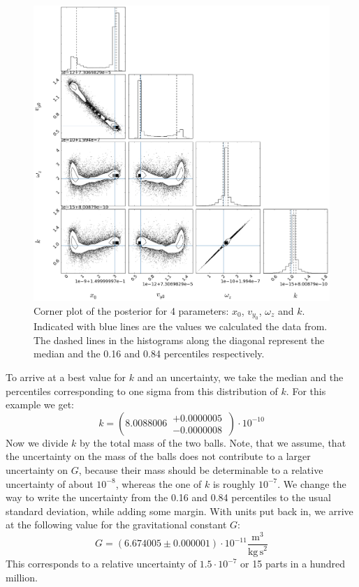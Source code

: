 \documentclass[prb,preprint]{revtex4-1}
\begin{document}
\begin{figure}[h]
	\centering
	\includegraphics[width=1.0\textwidth]{img/4cornerfit.png}
	\caption{Corner plot of the posterior for 4 parameters: $x_0$, $v_{y_0}$, $\omega_z$ and $k$. Indicated with blue lines are the values we calculated the data from. The dashed lines in the histograms along the diagonal represent the median and the 0.16 and 0.84 percentiles respectively.}
	\label{fig:plotCorner4}
\end{figure}

To arrive at a best value for $k$ and an uncertainty, we take the median and the percentiles corresponding to one sigma from this distribution of $k$. For this example we get:
\begin{equation}\label{eq:kfit}
k = \left( 8.0088006 \, \substack{+0.0000005 \\ -0.0000008}\, \right) \cdot 10^{-10}
\end{equation}
Now we divide $k$ by the total mass of the two balls. Note, that we assume, that the uncertainty on the mass of the balls does not contribute to a larger uncertainty on $G$, because their mass should be determinable to a relative uncertainty of about $10^{-8}$, whereas the one of $k$ is roughly $10^{-7}$. We change the way to write the uncertainty from the 0.16 and 0.84 percentiles to the usual standard deviation, while adding some margin. With units put back in, we arrive at the following value for the gravitational constant $G$:
\begin{equation}\label{Gfit}
G = \left(6.674005 \pm 0.000001 \right) \cdot 10^{-11}  \frac{\mathrm{m}^3}{\mathrm{kg \, s}^2}
\end{equation}
This corresponds to a relative uncertainty of $1.5 \cdot 10^{-7}$ or 15 parts in a hundred million.\\
\end{document}
